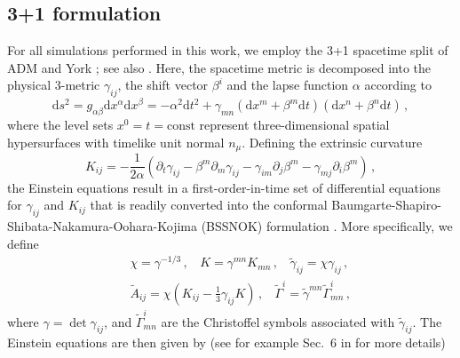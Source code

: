 \documentclass[]{iopart}
\newcommand{\du}{\mathrm{d}}
\newcommand{\us}[1]{\textcolor{teal}{[{\it\textbf{US: #1}}]} }
\renewcommand{\mr}[1]{\textcolor{purple}{[{\it\textbf{MR: #1}}]} }
\begin{document}
\subsection{3+1 formulation}
%
For all simulations performed in this work, we employ the
3+1 spacetime split of ADM \cite{Arnowitt:1962hi} and York \cite{York1979}; see also
\cite{Gourgoulhon:2007ue}. Here, the spacetime metric is
decomposed into the physical 3-metric $\gamma_{ij}$, the
shift vector $\beta^i$ and the lapse function $\alpha$ according to
%
\begin{equation}
  \du s^2 = g_{\alpha\beta}\du x^{\alpha}\du x^{\beta}
  = -\alpha^2 \du t^2 + \gamma_{mn}(\du x^m+\beta^m \du t)
  (\du x^n + \beta^n \du t)\,,
\end{equation}
%
where the level sets $x^0=t=\mathrm{const}$ represent three-dimensional
spatial hypersurfaces with timelike unit normal $n_{\mu}$.
Defining the extrinsic curvature
%
\begin{equation}
  K_{ij} = -\frac{1}{2\alpha}(\partial_t \gamma_{ij}
  -\beta^m\partial_m \gamma_{ij} -\gamma_{im}\partial_j
  \beta^m-\gamma_{mj}\partial_i \beta^m)\,,
  \label{eq:Kij}
\end{equation}
%
the Einstein equations result in a first-order-in-time
set of differential equations for $\gamma_{ij}$ and $K_{ij}$
that is readily converted into the conformal
Baumgarte-Shapiro-Shibata-Nakamura-Oohara-Kojima (BSSNOK)
formulation
\cite{Baumgarte:1998te,Shibata:1995we,Nakamura:1987zz}.
More specifically, we define
%
\begin{eqnarray}
  &&\chi = \gamma^{-1/3}\,,~~~~
  K=\gamma^{mn}K_{mn}\,,~~~~
  \tilde{\gamma}_{ij}=\chi \gamma_{ij}\,, \nonumber \\
  &&
  \tilde{A}_{ij}=\chi\left(K_{ij}-\frac{1}{3}\gamma_{ij}K\right)\,,~~~~
  \tilde{\Gamma}^i=\tilde{\gamma}^{mn}\tilde{\Gamma}^i_{mn}\,,
\end{eqnarray}
%
where $\gamma=\det \gamma_{ij}$, and $\tilde{\Gamma}^i_{mn}$
are the Christoffel symbols associated with $\tilde{\gamma}_{ij}$.
The Einstein equations are then given by (see for example
Sec.~6 in \cite{Cardoso:2014uka} for more details)
%
\end{document}
